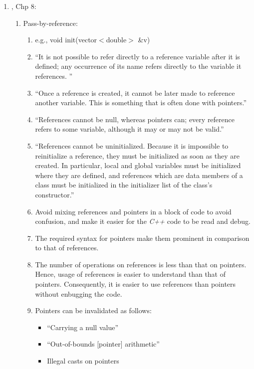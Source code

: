 \begin{enumerate}
\begin{enumerate}
\begin{enumerate}
		\end{enumerate}
	\item \cite{Stroustrup2014}, Chp 8: \vspace{-0.2cm}
		\begin{enumerate} \itemsep -2pt
		\item Pass-by-reference: \vspace{-0.1cm}
			\begin{enumerate} \itemsep -1pt
			\item e.g., void init(vector$<$double$>$ \&v)
			\item ``It is not possible to refer directly to a reference variable after it is defined; any occurrence of its name refers directly to the variable it references. ''
			\item ``Once a reference is created, it cannot be later made to reference another variable. This is something that is often done with pointers.''
			\item ``References cannot be null, whereas pointers can; every reference refers to some variable, although it may or may not be valid.''
			\item ``References cannot be uninitialized. Because it is impossible to reinitialize a reference, they must be initialized as soon as they are created. In particular, local and global variables must be initialized where they are defined, and references which are data members of a class must be initialized in the initializer list of the class's constructor.''
			\item Avoid mixing references and pointers in a block of code to avoid confusion, and make it easier for the {\it C++} code to be read and debug.
			\item The required syntax for pointers make them prominent in comparison to that of references.
			\item The number of operations on references is less than that on pointers. Hence, usage of references is easier to understand than that of pointers. Consequently, it is easier to use references than pointers without enbugging the code.
			\item Pointers can be invalidated as follows: \vspace{-0.1cm}
				\begin{itemize} \itemsep -1pt
				\item ``Carrying a null value''
				\item ``Out-of-bounds [pointer] arithmetic''
				\item Illegal casts on pointers

\end{itemize}
\end{enumerate}
\end{enumerate}
\end{enumerate}
\end{enumerate}
